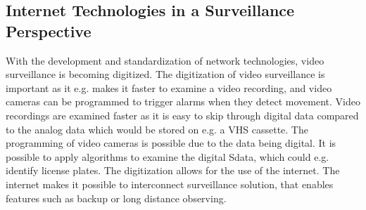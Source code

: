 \subsection{Internet Technologies in a Surveillance Perspective}
With the development and standardization of network technologies, video surveillance is becoming digitized.
The digitization of video surveillance is important as it e.g. makes it faster to examine a video recording, and video cameras can be programmed to trigger alarms when they detect movement.
Video recordings are examined faster as it is easy to skip through digital data compared to the analog data which would be stored on e.g. a VHS cassette.
The programming of video cameras is possible due to the data being digital. 
It is possible to apply algorithms to examine the digital Sdata, which could e.g. identify license plates.
The digitization allows for the use of the internet.
The internet makes it possible to interconnect surveillance solution, that enables features such as backup or long distance observing.














